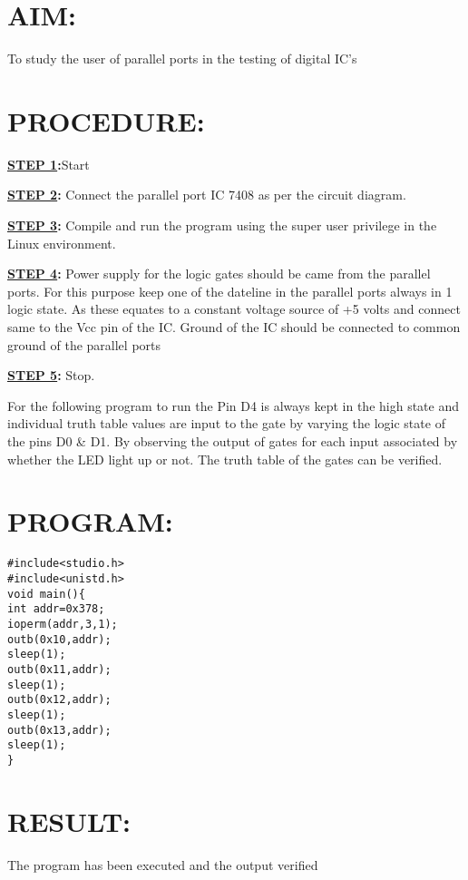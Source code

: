 
%
%
%
%
\section*{AIM:}
To study the user of parallel ports in the testing of digital IC's

\section*{PROCEDURE:}
\textbf{\underline{STEP 1}:}Start

\textbf{\underline{STEP 2}:} Connect the parallel port IC 7408 as per the circuit diagram.

\textbf{\underline{STEP 3}:}  Compile and run the program using the super user privilege in the Linux environment.

\textbf{\underline{STEP 4}:}  Power supply for the logic gates should be came from the parallel ports. For this purpose keep one of the dateline in the parallel ports always in 1 logic state.
As these equates to a constant voltage source of +5 volts and connect same to the Vcc pin of the IC. Ground of the IC should be connected to common ground of the parallel ports

\textbf{\underline{STEP 5}:} Stop.

For the following program to run the Pin D4 is always kept in the high state and individual truth table values are input to the gate by varying the logic state of the pins D0 \& D1. By observing the output of gates for each input associated by whether the LED light up or not. The truth table of the gates can be verified.


\section*{PROGRAM:}

\begin{lstlisting}
#include<studio.h>
#include<unistd.h>
void main(){
int addr=0x378;
ioperm(addr,3,1);
outb(0x10,addr);
sleep(1);
outb(0x11,addr);
sleep(1);
outb(0x12,addr);
sleep(1);
outb(0x13,addr);
sleep(1);
}

\end{lstlisting}



\section*{RESULT:}
The program has been executed and the output verified
%
%
%
%
